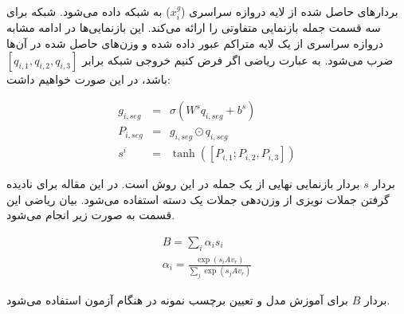 بردار‌های حاصل شده از لایه دروازه سراسری ($x^{g}_i$) به شبکه  داده می‌شود. شبکه 
برای سه قسمت جمله بازنمایی متفاوتی را ارائه
می‌کند. این بازنمایی‌ها در ادامه مشابه دروازه سراسری از یک لایه متراکم عبور داده شده و وزن‌های حاصل شده در آن‌ها ضرب می‌شود.
به عبارت ریاضی اگر فرض کنیم خروجی شبکه  برابر $[q_{i,1}, q_{i,2}, q_{i,3}]$ باشد، در این صورت خواهیم داشت:

\begin{eqnarray}
    g_{i, seg} & = & \sigma(W^sq_{i,seg} + b^s) \\
    P_{i,seg} & = & g_{i,seg} \odot q_{i,seg} \\
    s^{i}  & = & \tanh([P_{i,1}; P_{i,2}, P_{i,3}])
\end{eqnarray}

بردار $s$ بردار بازنمایی نهایی از یک جمله در این روش است. در این مقاله برای نادیده گرفتن جملات نویزی از وزن‌دهی
جملات یک دسته استفاده می‌شود. بیان ریاضی این قسمت به صورت زیر انجام می‌شود.

\begin{eqnarray}
    B = \sum_{i} \alpha_i s_i \\
    \alpha_i = \frac{\exp(s_iAv_r)}{\sum_{j} \exp(s_jAv_r)}
\end{eqnarray}

بردار $B$ برای آموزش مدل و تعیین برچسب نمونه در هنگام آزمون استفاده می‌شود.


